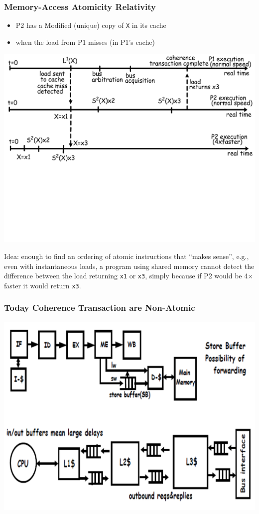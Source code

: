\documentclass{beamer}
\newcommand{\emp}[1]{\textcolor{DikuRed}{ #1}}
\begin{document}
\begin{frame}[fragile,t]
\frametitle{Memory-Access Atomicity Relativity}

\begin{itemize}
    \item P2 has a Modified (unique) copy of {\tt X} in its cache
    \item when the load from P1 misses (in P1's cache)
\end{itemize}

{\center \includegraphics[width=59ex]{Ch7Figs/CoherenceEG1}}\pause
\vspace{-18ex}

\emp{Idea: enough to find an ordering of atomic instructions that ``makes sense''}, e.g.,
even with instantaneous loads, a program using shared memory 
cannot detect the difference between the load returning {\tt x1} or 
{\tt x3}, simply because if P2 would be 4$\times$ faster it would return {\tt x3}.

\end{frame}


\begin{frame}[fragile,t]
\frametitle{Today Coherence Transaction are Non-Atomic}

{\center \includegraphics[width=59ex]{Ch7Figs/SoteBuffs}}

\end{frame}
\end{document}
